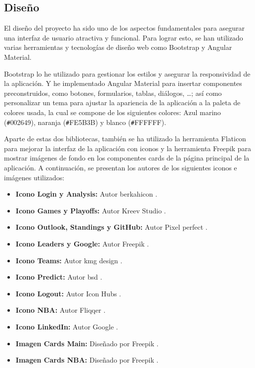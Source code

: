 \subsection{Diseño}
El diseño del proyecto ha sido uno de los aspectos fundamentales para asegurar una interfaz de usuario atractiva y funcional. Para lograr esto, se han utilizado varias herramientas y tecnologías de diseño web como Bootstrap y Angular Material.

Bootstrap lo he utilizado para gestionar los estilos y asegurar la responsividad de la aplicación. Y he implementado Angular Material para insertar componentes preconstruidos, como botones, formularios, tablas, diálogos, \ldots; así como personalizar un tema para ajustar la apariencia de la aplicación a la paleta de colores usada, la cual se compone de los siguientes colores: Azul marino (\texttt{\#}002649), naranja (\texttt{\#}FE5B3B) y blanco (\texttt{\#}FFFFFF).

Aparte de estas dos bibliotecas, también se ha utilizado la herramienta Flaticon para mejorar la interfaz de la aplicación con iconos y la herramienta Freepik para mostrar imágenes de fondo en los componentes cards de la página principal de la aplicación. A continuación, se presentan los autores de los siguientes iconos e imágenes utilizados:
\begin{itemize}
\tightlist
    \item 
        \textbf{Icono Login y Analysis:} Autor berkahicon \cite{berkahicon}.
    \item 
        \textbf{Icono Games y Playoffs:} Autor Kreev Studio \cite{kreev-studio}.
    \item 
        \textbf{Icono Outlook, Standings y GitHub:} Autor Pixel perfect \cite{pixel-perfect}.
    \item
        \textbf{Icono Leaders y Google:} Autor Freepik \cite{autor-freepik}.
    \item 
        \textbf{Icono Teams:} Autor kmg design \cite{kmg-design}.
    \item 
        \textbf{Icono Predict:} Autor bsd \cite{bsd}.
    \item 
        \textbf{Icono Logout:} Autor Icon Hubs \cite{icon-hubs}.
    \item
        \textbf{Icono NBA:} Autor Fliqqer \cite{fliqqer}.
    \item 
        \textbf{Icono LinkedIn:} Autor Google \cite{autor-google}.
    \item 
        \textbf{Imagen Cards Main:} Diseñado por Freepik \cite{freepik-main}.
    \item 
        \textbf{Imagen Cards NBA:} Diseñado por Freepik \cite{freepik-nba}.
\end{itemize}

